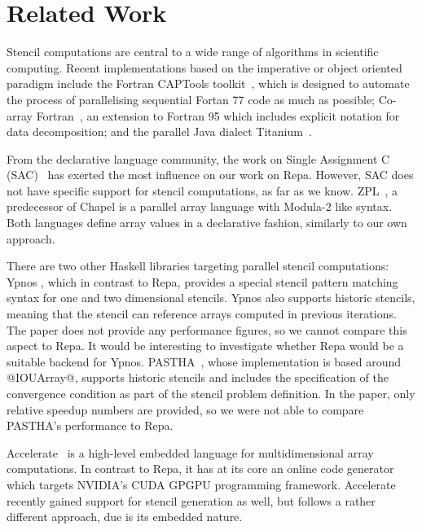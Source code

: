 
\section{Related Work}
Stencil computations are central to a wide range of algorithms in scientific computing.  Recent implementations based on the imperative or object oriented paradigm include the Fortran CAPTools toolkit~\cite{Ierotheou:1996:CAP:226107.226109}, which is designed to automate the process of parallelising sequential Fortan 77 code as much as possible; Co-array Fortran~\cite{DBLP:journals/tjs/Numrich10}, an extension to Fortran 95 which includes explicit notation for data decomposition; and the parallel Java dialect Titanium~\cite{Hilfinger:2001:TLR:894131}. 

From the declarative language community, the work on Single Assignment C (SAC)~\cite{scholz:SaC} has exerted the most influence on our work on Repa. However, SAC does not have specific support for stencil computations, as far as we know. ZPL~\cite{zpl}, a predecessor of Chapel \cite{Barrett:finite-difference-chapel} is a parallel array language with Modula-2 like syntax. Both languages define array values in a declarative fashion, similarly to our own approach.

There are two other Haskell libraries targeting parallel stencil computations: Ypnos \cite{Orchard:ypnos}, which in contrast to Repa, provides a special stencil pattern matching syntax for one and two dimensional stencils. Ypnos also supports historic stencils, meaning that the stencil can reference arrays computed in previous iterations. The paper does not provide any performance figures, so we cannot compare this aspect to Repa. It would be interesting to investigate whether Repa would be a suitable backend for Ypnos. PASTHA~\cite{Lesniak:pastha}, whose implementation is based around @IOUArray@, supports historic stencils and includes the specification of the convergence condition as part of the stencil problem definition. In the paper, only relative speedup numbers are provided, so we were not able to compare PASTHA's performance to Repa.

Accelerate~\cite{Chakravarty:accelerate} is a high-level embedded language for multidimensional array computations. In contrast to Repa, it has at its core an online code generator which targets NVIDIA's CUDA GPGPU programming framework. Accelerate recently gained support for stencil generation as well, but follows a rather different approach, due is its embedded nature.


